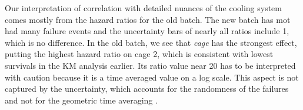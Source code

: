 Our interpretation of correlation with detailed nuances of the cooling
system comes mostly from the hazard ratios for the old batch. The new
batch has mot had many failure events and the uncertainty bars of
nearly all ratios include 1, which is no difference. In the old batch,
we see that {\em cage} has the strongest effect, putting the highest
hazard ratio on cage 2, which is consistent with lowest survivals in
the KM analysis earlier. Its ratio value near 20 has to be interpreted
with caution because it is a time averaged value on a log scale. This
aspect is not captured by the uncertainty, which accounts for the
randomness of the failures and not for the geometric time averaging
\cite{coxhazardinterpret}.
